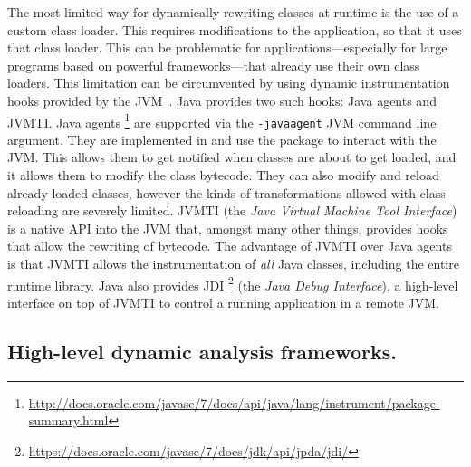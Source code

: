 The most limited way for dynamically rewriting \java{} classes at runtime
is the use of a custom class loader.
This requires modifications to the application,
so that it uses that class loader.
This can be problematic for applications---especially for large programs
based on powerful frameworks---that already use their own class loaders.
This limitation can be circumvented by using dynamic instrumentation
hooks provided by the JVM~\cite{lindholmJavaVirtualMachine}.
Java provides two such hooks: Java agents and JVMTI.
Java agents%
\footnote{\url{http://docs.oracle.com/javase/7/docs/api/java/lang/instrument/package-summary.html}} 
are supported via the \texttt{-javaagent} JVM command line argument.
They are implemented in \java{} and use the  package to interact with the JVM.
This allows them to get notified when classes are about to get loaded,
and it allows them to modify the class bytecode.
They can also modify and reload already loaded classes,
however the kinds of transformations allowed with class reloading are severely limited.
JVMTI (the \emph{Java Virtual Machine Tool Interface}) is a native API into the JVM that, 
amongst many other things, provides hooks that allow the
rewriting of bytecode.
The advantage of JVMTI over Java agents is that JVMTI allows the instrumentation of \emph{all} Java classes, including the entire runtime library.
Java also provides JDI%
\footnote{\url{https://docs.oracle.com/javase/7/docs/jdk/api/jpda/jdi/}}
(the \emph{Java Debug Interface}), 
a high-level interface on top of JVMTI to control a running application in a remote JVM.

\subsection*{High-level dynamic analysis frameworks.}

